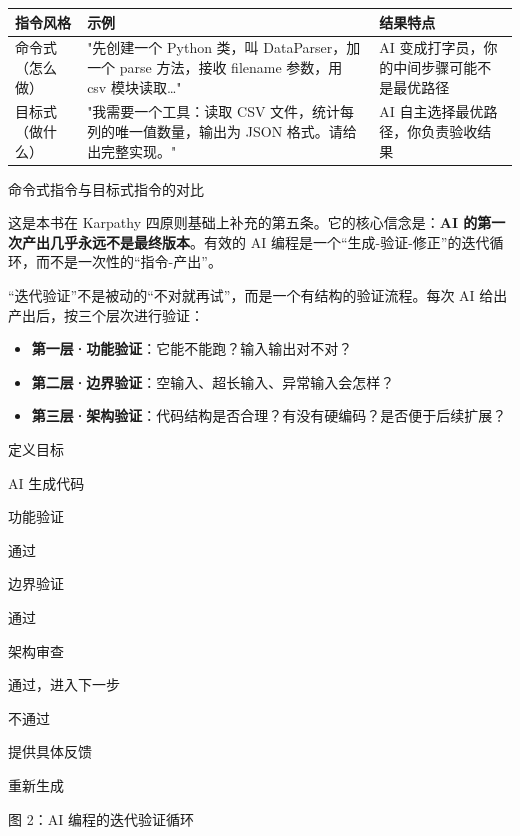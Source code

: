 \begin{center}
\begin{tabularx}{\linewidth}{|X|X|X|}
\hline
\textbf{指令风格} & \textbf{示例} & \textbf{结果特点} \tabularnewline
\hline
命令式（怎么做） & "先创建一个 Python 类，叫 DataParser，加一个 parse 方法，接收 filename 参数，用 csv 模块读取…" & AI 变成打字员，你的中间步骤可能不是最优路径 \tabularnewline
目标式（做什么） & "我需要一个工具：读取 CSV 文件，统计每列的唯一值数量，输出为 JSON 格式。请给出完整实现。" & AI 自主选择最优路径，你负责验收结果 \tabularnewline
\hline
\end{tabularx}
\end{center}

\begin{center}\small\color{gray}命令式指令与目标式指令的对比\end{center}


这是本书在 Karpathy 四原则基础上补充的第五条。它的核心信念是：\textbf{AI 的第一次产出几乎永远不是最终版本}。有效的 AI 编程是一个“生成-验证-修正”的迭代循环，而不是一次性的“指令-产出”。

“迭代验证”不是被动的“不对就再试”，而是一个有结构的验证流程。每次 AI 给出产出后，按三个层次进行验证：

\begin{itemize}
  \item \textbf{第一层·功能验证}：它能不能跑？输入输出对不对？
  \item \textbf{第二层·边界验证}：空输入、超长输入、异常输入会怎样？
  \item \textbf{第三层·架构验证}：代码结构是否合理？有没有硬编码？是否便于后续扩展？
\end{itemize}

定义目标

AI 生成代码

功能验证

通过

边界验证

通过

架构审查

通过，进入下一步

不通过

提供具体反馈

重新生成

\begin{center}\small\color{gray}图 2：AI 编程的迭代验证循环\end{center}

